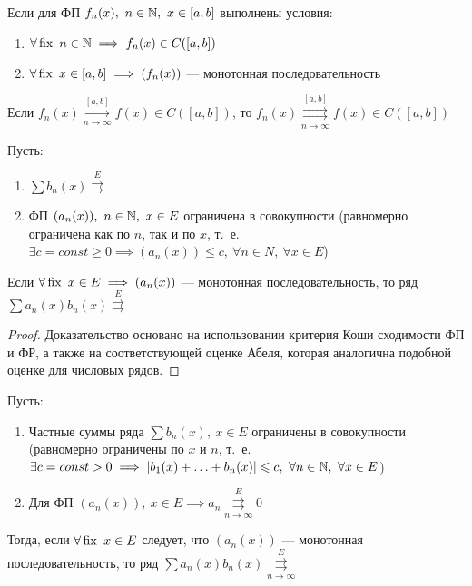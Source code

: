 \documentclass[../../main.tex]{subfiles}
\begin{document}
\begin{thm}
Если для ФП $f_n(x),\ n \in \mathbb{N},\ x \in [a,b]$ выполнены условия:
	\begin{enumerate}
		\item $\forall \operatorname{fix} \ n \in \mathbb{N} \implies
		f_n(x) \in C([a,b])$
		\item $\forall \operatorname{fix} \ x \in [a,b] \implies
		(f_n(x))$ --- монотонная последовательность 
	\end{enumerate}			
Если $f_n(x) \overset{[a,b]}
{\underset{n \to \infty}\longrightarrow} f(x) \in C([a,b])$, то
$f_n(x) \overset{[a,b]}
{\underset{n \to \infty}\rightrightarrows} f(x) \in C([a,b])$
\end{thm}  

\begin{thm}
Пусть:
\begin{enumerate}
	\item $\sum b_n(x) \overset{E}{\rightrightarrows}$
	\item ФП $(a_n(x)),\ n \in \mathbb{N},\ x \in E$ ограничена 
в совокупности (равномерно ограничена как по $n$, так и по $x$, т.~е.
$\exists c = const \geq 0 \implies (a_n(x)) \leq c,\ 
\forall n \in N, \ \forall x \in E$)
\end{enumerate}
Если $\forall \operatorname{fix} \ x \in E \implies (a_n(x))$ --- монотонная 
последовательность, то ряд $\sum a_n(x)b_n(x) \overset{E}{\rightrightarrows}$
\end{thm}	

\begin{proof}
Доказательство основано на использовании критерия Коши сходимости ФП и ФР,
а также на соответствующей оценке Абеля, которая аналогична подобной оценке
для числовых рядов.	
\end{proof}

\begin{thm}
Пусть:
\begin{enumerate}
	\item Частные суммы ряда $\sum b_n(x),\ x \in E$ 
ограничены в совокупности (равномерно ограничены по $x$ и $n$, 
т.~е. $\exists c = const > 0 \implies |b_1(x) + \ldots + b_n(x)| \leqslant c,\
\forall n \in \mathbb{N},\ \forall x \in E$)
	\item Для ФП $(a_n(x)),\ x \in E \implies a_n 
\overset{E}
{\underset{n \to \infty}\rightrightarrows} 0$
\end{enumerate}
Тогда, если $\forall \operatorname{fix} \ x \in E$ следует, 
что $(a_n(x))$ --- монотонная последовательность, 
то ряд $\sum a_n(x)b_n(x) \overset{E}
{\underset{n \to \infty}\rightrightarrows}$
\end{thm}
\end{document}

